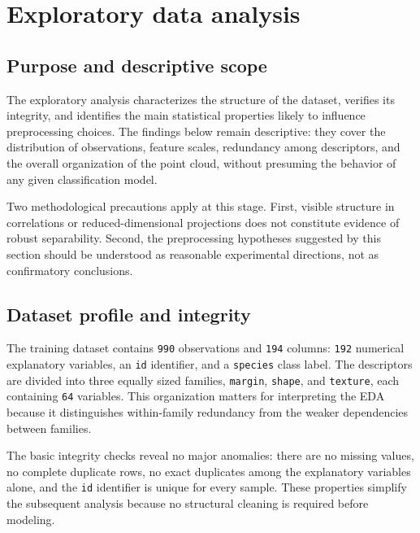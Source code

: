 \section{Exploratory data analysis}

\subsection{Purpose and descriptive scope}
The exploratory analysis characterizes the structure of the dataset, verifies its integrity, and identifies the main statistical properties likely to influence preprocessing choices. The findings below remain descriptive: they cover the distribution of observations, feature scales, redundancy among descriptors, and the overall organization of the point cloud, without presuming the behavior of any given classification model.

Two methodological precautions apply at this stage. First, visible structure in correlations or reduced-dimensional projections does not constitute evidence of robust separability. Second, the preprocessing hypotheses suggested by this section should be understood as reasonable experimental directions, not as confirmatory conclusions.

\subsection{Dataset profile and integrity}
The training dataset contains \texttt{990} observations and \texttt{194} columns: \texttt{192} numerical explanatory variables, an \texttt{id} identifier, and a \texttt{species} class label. The descriptors are divided into three equally sized families, \texttt{margin}, \texttt{shape}, and \texttt{texture}, each containing \texttt{64} variables. This organization matters for interpreting the EDA because it distinguishes within-family redundancy from the weaker dependencies between families.

The basic integrity checks reveal no major anomalies: there are no missing values, no complete duplicate rows, no exact duplicates among the explanatory variables alone, and the \texttt{id} identifier is unique for every sample. These properties simplify the subsequent analysis because no structural cleaning is required before modeling.

